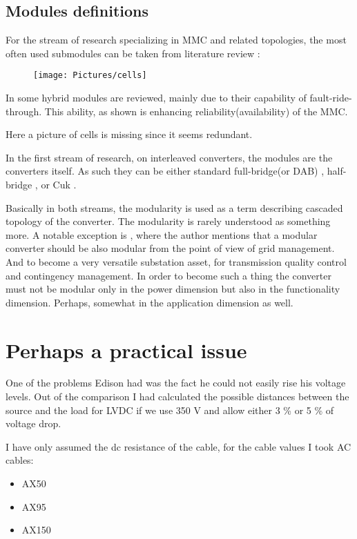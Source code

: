 \documentclass[]{scrartcl}
\begin{document}
\subsection{Modules definitions}
For the stream of research specializing in MMC and related topologies, the most often used submodules can be taken from literature review \cite{Perez2014b}:

\begin{figure}[h!]
\centering
\texttt{[image: Pictures/cells]}
\caption{}
\label{fig:cells}
\end{figure}




In \cite{Xu2016b} some hybrid modules are reviewed, mainly due to their capability of fault-ride-through. This ability, as shown is enhancing reliability(availability) of the MMC. 

Here a picture of cells is missing since it seems redundant.


\newpage

In the first stream of research, on interleaved converters, the modules are the converters itself. As such they can be either standard full-bridge(or DAB) \cite{Bottion2015}, half-bridge \cite{Yao2012}, or Cuk \cite{Kamnarn2009}. 

Basically in both streams, the modularity is used as a term describing cascaded topology of the converter. The modularity is rarely understood as something more. A notable exception is \cite{Yousefpoor2014}, where the author mentions that a modular converter should be also modular from the point of view of grid management. And to become a very versatile  substation asset, for transmission quality control and contingency management. In order to become such a thing the converter must not be modular only in the power dimension but also in the functionality dimension. Perhaps, somewhat in the application dimension as well. 


\newpage
\appendix
\section{Perhaps a practical issue}
One of the problems Edison had was the fact he could not easily rise his voltage levels. Out of the comparison I had calculated the possible distances between the source and the load for LVDC if we use 350 V and allow either 3 \% or 5 \% of voltage drop. 

I have only assumed the dc resistance of the cable, for the cable values I took AC cables:
\begin{itemize}
	\item AX50
	\item AX95
	\item AX150
\end{itemize}
\end{document}
